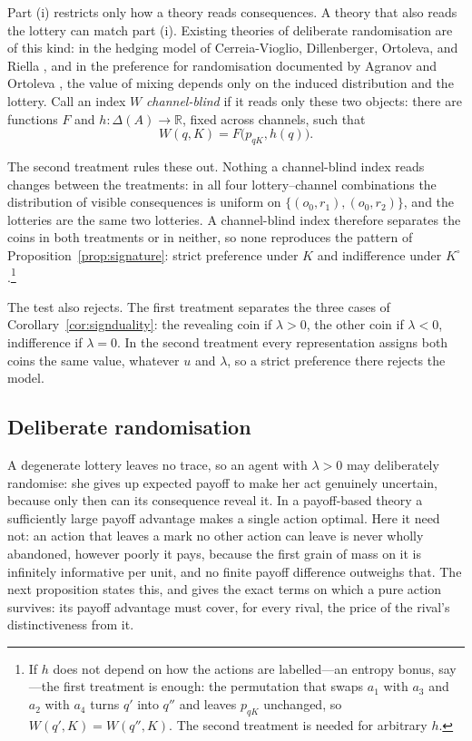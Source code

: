 \documentclass[11pt,a4paper]{article}
\theoremstyle{definition}
\newcommand{\D}{\Delta}
\newcommand{\Rnum}{\mathbb R}
\newcommand{\1}{\mathbf 1}
\begin{document}
Part \textup{(i)} restricts only how a theory reads consequences.  A theory that also reads the lottery can
match part \textup{(i)}.  Existing theories of deliberate randomisation are of this kind: in the hedging model
of Cerreia-Vioglio, Dillenberger, Ortoleva, and Riella \cite{CerreiaVioglioDillenbergerOrtolevaRiella2019}, and
in the preference for randomisation documented by Agranov and Ortoleva \cite{AgranovOrtoleva2017}, the value of
mixing depends only on the induced distribution and the lottery.  Call an index $W$ \emph{channel-blind} if it
reads only these two objects: there are functions $F$ and $h:\D(A)\to\Rnum$, fixed across channels, such that
\[
 W(q,K)=F\bigl(p_{qK},h(q)\bigr).
\]

The second treatment rules these out.  Nothing a channel-blind index reads changes between the treatments: in
all four lottery--channel combinations the distribution of visible consequences is uniform on
$\{(o_0,r_1),(o_0,r_2)\}$, and the lotteries are the same two lotteries.  A channel-blind index therefore
separates the coins in both treatments or in neither, so none reproduces the pattern of
Proposition~\ref{prop:signature}: strict preference under $K$ and indifference under
$K^\circ$.\footnote{If $h$ does not depend on how the actions are labelled---an entropy bonus, say---the first
treatment is enough: the permutation that swaps $a_1$ with $a_3$ and $a_2$ with $a_4$ turns $q'$ into $q''$ and
leaves $p_{qK}$ unchanged, so $W(q',K)=W(q'',K)$.  The second treatment is needed for arbitrary $h$.}

The test also rejects.  The first treatment separates the three cases of Corollary~\ref{cor:signduality}: the
revealing coin if $\lambda>0$, the other coin if $\lambda<0$, indifference if $\lambda=0$.  In the second
treatment every representation assigns both coins the same value, whatever $u$ and $\lambda$, so a strict
preference there rejects the model.

\subsection{Deliberate randomisation}\label{sec:randomisation}

A degenerate lottery leaves no trace, so an agent with $\lambda>0$ may deliberately randomise: she gives up
expected payoff to make her act genuinely uncertain, because only then can its consequence reveal it.  In a
payoff-based theory a sufficiently large payoff advantage makes a single action optimal.  Here it need not: an
action that leaves a mark no other action can leave is never wholly abandoned, however poorly it pays, because
the first grain of mass on it is infinitely informative per unit, and no finite payoff difference outweighs
that.  The next proposition states this, and gives the exact terms on which a pure action survives: its payoff
advantage must cover, for every rival, the price of the rival's distinctiveness from it.
\end{document}
